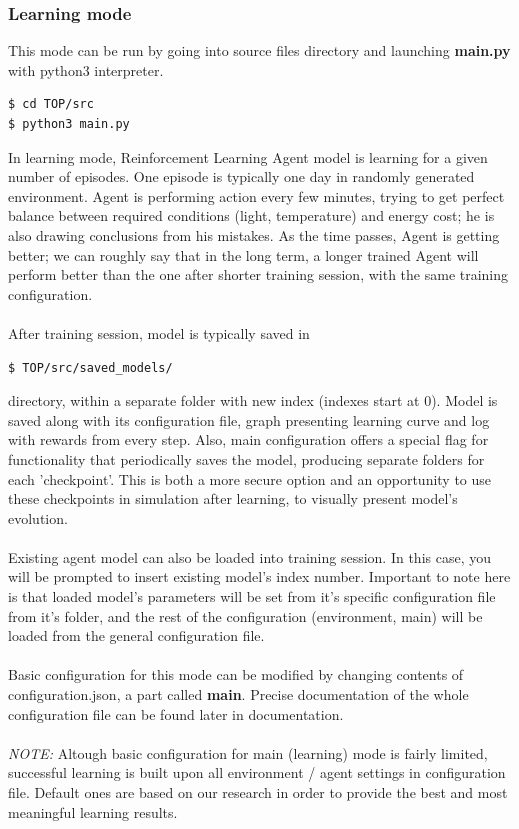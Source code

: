 \documentclass{article}
\begin{document}
\subsubsection{Learning mode}
This mode can be run by going into source files directory and launching \textbf{main.py}
 with python3 interpreter. 
\begin{lstlisting} 
$ cd TOP/src
$ python3 main.py
\end{lstlisting}
In learning mode, Reinforcement Learning Agent model is learning for a given number of episodes.
One episode is typically one day in randomly generated environment. Agent is performing action every few minutes, trying to get perfect balance between required conditions (light, temperature) and energy cost; he is also drawing conclusions from his mistakes. As the time passes, Agent is getting better; we can roughly say
that in the long term, a longer trained Agent will perform better than the one after shorter training session,
with the same training configuration.
\\\\
After training session, model is typically saved in
\begin{lstlisting}
$ TOP/src/saved_models/
\end{lstlisting}
directory, within a separate folder with new index (indexes start at 0). Model is saved along with its configuration file, graph presenting learning curve and log with rewards from every step. Also, main configuration offers a special flag for functionality that periodically saves the model, producing separate folders for each 'checkpoint'. This is both a more secure option and an opportunity to use these checkpoints in simulation after learning, to visually present model's evolution.
\\\\
Existing agent model can also be loaded into training session. In this case, you will be prompted to insert existing model's index number. Important to note here is that loaded model's parameters will be set from it's specific configuration file from it's folder, and the rest of the configuration (environment, main) will be loaded from the general configuration file.
\\\\ 
Basic configuration for this mode can be modified by changing contents of configuration.json, a part called \textbf{main}. Precise documentation of the whole configuration file can be found later in documentation. 
\\\\
\textit{NOTE:} Altough basic configuration for main (learning) mode is fairly limited, successful learning is built upon all environment / agent settings in configuration file. Default ones are based on our research in order to provide the best and most meaningful learning results.
\end{document}
